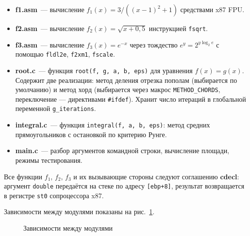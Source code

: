 \documentclass[a4paper,12pt,titlepage,finall]{article}
\begin{document}
\begin{itemize}
    \item \textbf{f1.asm}~--- вычисление $f_1(x) = 3/((x-1)^2+1)$ средствами x87 FPU.
    \item \textbf{f2.asm}~--- вычисление $f_2(x) = \sqrt{x+0{,}5}$ инструкцией \texttt{fsqrt}.
    \item \textbf{f3.asm}~--- вычисление $f_3(x) = e^{-x}$ через тождество
          $e^y = 2^{y \log_2 e}$ с помощью \texttt{fldl2e}, \texttt{f2xm1}, \texttt{fscale}.
    \item \textbf{root.c}~--- функция \texttt{root(f, g, a, b, eps)} для уравнения
          $f(x)=g(x)$. Содержит две реализации: метод деления отрезка пополам
          (выбирается по умолчанию) и метод хорд (выбирается через макрос
          \texttt{METHOD\_CHORDS}, переключение --- директивами \texttt{\#ifdef}).
          Хранит число итераций в глобальной переменной \texttt{g\_iterations}.
    \item \textbf{integral.c}~--- функция \texttt{integral(f, a, b, eps)}: метод средних
          прямоугольников с остановкой по критерию Рунге.
    \item \textbf{main.c}~--- разбор аргументов командной строки, вычисление площади,
          режимы тестирования.
\end{itemize}

Все функции $f_1$, $f_2$, $f_3$ и их вызывающие стороны следуют соглашению \textbf{cdecl}:
аргумент \texttt{double} передаётся на стеке по адресу \texttt{[ebp+8]}, результат
возвращается в регистре \texttt{st0} сопроцессора x87.

Зависимости между модулями показаны на рис.~\ref{dep}.

\begin{figure}[h]
\centering
{}
\caption{Зависимости между модулями}
\label{dep}
\end{figure}
\end{document}
